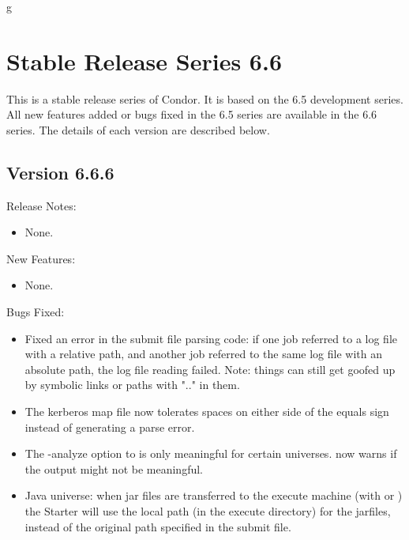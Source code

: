 g%
\section{\label{sec:History-6-6}Stable Release Series 6.6}

This is a stable release series of Condor.
It is based on the 6.5 development series.
All new features added or bugs fixed in the 6.5 series are available
in the 6.6 series.
The details of each version are described below.


\subsection{\label{sec:New-6-6-6}Version 6.6.6}

\noindent Release Notes:

\begin{itemize}

\item None.

\end{itemize}


\noindent New Features:

\begin{itemize}

\item None.

\end{itemize}

\noindent Bugs Fixed:

\begin{itemize}

\item Fixed an error in the  submit file parsing code:
  if one job referred to a log file with a relative path, and another
  job referred to the same log file with an absolute path, the log file
  reading failed.  Note: things can still get goofed up by symbolic
  links or paths with ".." in them.

\item The kerberos map file now tolerates spaces on either side of the equals sign instead of generating a parse error.

\item The -analyze option to  is only meaningful for certain
  universes.   now warns if the output might not be meaningful. 

\item Java universe: when jar files are transferred to the execute machine (with  or ) the Starter will use the local path (in the execute directory) for the jarfiles, instead of the original path specified in the submit file.

\end{itemize}

